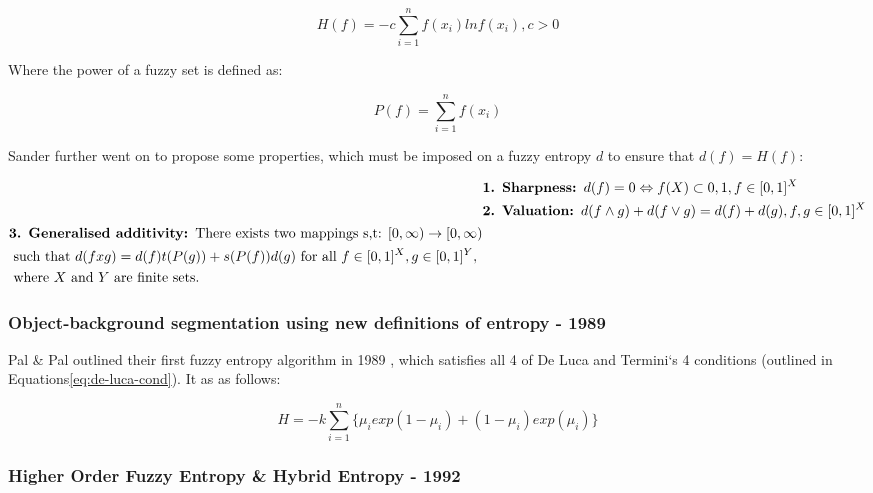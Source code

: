 \begin{equation}\label{eq:fuzzy-shannon}
  H(f) = -c \displaystyle\sum_{i=1}^{n}{f(x_i)lnf(x_i), c > 0}
\end{equation}

Where the power of a fuzzy set is defined as:

\begin{equation}
  P(f) = \displaystyle\sum_{i=1}^{n}{f (x_i)}
\end{equation}

Sander further went on to propose some properties, which must be imposed on a fuzzy entropy $d$ to ensure that $d(f) = H(f)$:

\begin{subequations}
  \begin{align}
    &\text{\textbf{1. Sharpness: }} d(f) = 0 \Leftrightarrow f(X) \subset {0,1}, f \in [0,1]^X \\
    &\text{\textbf{2. Valuation: }} d(f \wedge g) + d(f \vee g) = d(f) + d(g), f,g \in [0,1]^X \\
    \begin{split}
    &\text{\textbf{3. Generalised additivity: }} \text{There exists two mappings s,t: } [0,\infty) \rightarrow  [0,\infty) \\
      &\text{ such that } d(f x g) = d(f)t(P(g)) + s(P(f))d(g) \text{ for all } f \in [0,1]^X, g \in [0,1]^Y, \\
      &\text{ where } X \text{ and } Y \text{ are finite sets.}
    \end{split}
  \end{align}
\end{subequations}

\subsubsection{Object-background segmentation using new definitions of entropy - 1989}

Pal \& Pal outlined their first fuzzy entropy algorithm in 1989 \cite{Pal_Pal_1989}, which satisfies all 4 of De Luca and Termini`s 4 conditions (outlined in Equations\eqref{eq:de-luca-cond}). It as as follows:

\begin{equation} \label{eq:pal-pal-orig}
  H = -k  \displaystyle\sum_{i=1}^{n}{\{\mu_iexp(1 - \mu_i) + (1 - \mu_i)exp(\mu_i)\}}
\end{equation}

\subsubsection{Higher Order Fuzzy Entropy \& Hybrid Entropy - 1992}
\label{sssec:hybrid-section}

